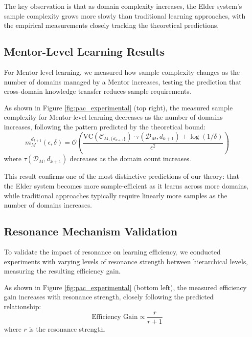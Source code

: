 The key observation is that as domain complexity increases, the Elder system's sample complexity grows more slowly than traditional learning approaches, with the empirical measurements closely tracking the theoretical predictions.

\subsection{Mentor-Level Learning Results}

For Mentor-level learning, we measured how sample complexity changes as the number of domains managed by a Mentor increases, testing the prediction that cross-domain knowledge transfer reduces sample requirements.

\begin{result}
As shown in Figure \ref{fig:pac_experimental} (top right), the measured sample complexity for Mentor-level learning decreases as the number of domains increases, following the pattern predicted by the theoretical bound:
\begin{equation}
m_{M}^{d_{k+1}}(\epsilon, \delta) = \mathcal{O}\left(\frac{\text{VC}(\mathcal{C}_{M,\{d_{k+1}\}}) \cdot \tau(\mathcal{D}_M, d_{k+1}) + \log(1/\delta)}{\epsilon^2}\right)
\end{equation}
where $\tau(\mathcal{D}_M, d_{k+1})$ decreases as the domain count increases.
\end{result}

This result confirms one of the most distinctive predictions of our theory: that the Elder system becomes more sample-efficient as it learns across more domains, while traditional approaches typically require linearly more samples as the number of domains increases.

\subsection{Resonance Mechanism Validation}

To validate the impact of resonance on learning efficiency, we conducted experiments with varying levels of resonance strength between hierarchical levels, measuring the resulting efficiency gain.

\begin{result}
As shown in Figure \ref{fig:pac_experimental} (bottom left), the measured efficiency gain increases with resonance strength, closely following the predicted relationship:
\begin{equation}
\text{Efficiency Gain} \propto \frac{r}{r + 1}
\end{equation}
where $r$ is the resonance strength.
\end{result}

